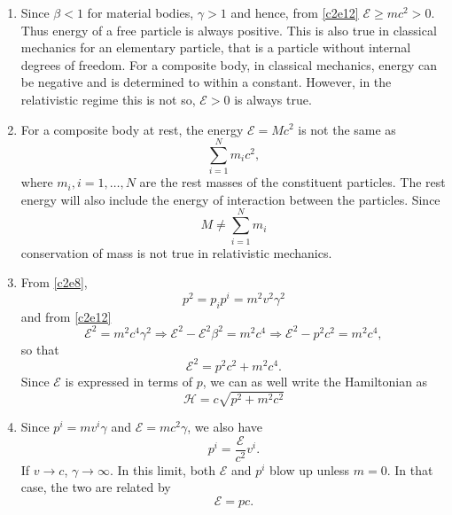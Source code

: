 \begin{enumerate}
\item Since $\beta < 1$ for material bodies, $\gamma > 1$ and hence, from 
\eqref{c2e12} $\mathcal{E} \ge mc^2 > 0$. Thus energy of a free particle is always positive.
This is also true in classical mechanics for an elementary particle, that is a
particle without internal degrees of freedom. For a composite body, in classical
mechanics, energy can be negative and is determined to within a constant. However,
in the relativistic regime this is not so, $\mathcal{E} > 0$ is always true.

\item For a composite body at rest, the energy $\mathcal{E} = Mc^2$ is not the same as 
\[
\sum_{i=1}^N m_ic^2,
\]
where $m_i, i = 1, \ldots, N$ are the rest masses of the constituent particles.
The rest energy will also include the energy of interaction between the particles.
Since 
\[
M \ne \sum_{i=1}^N m_i
\]
conservation of mass is not true in relativistic mechanics.

\item From \eqref{c2e8},
\[
p^2 = p_ip^i = m^2v^2\gamma^2
\]
and from \eqref{c2e12}
\[
\mathcal{E}^2 = m^2c^4\gamma^2 \Rightarrow \mathcal{E}^2 - \mathcal{E}^2\beta^2 
= m^2c^4 \Rightarrow \mathcal{E}^2 - p^2c^2  = m^2c^4,
\]
so that
\begin{equation}\label{c2e15}
\mathcal{E}^2 = p^2c^2 + m^2c^4.
\end{equation}
Since $\mathcal{E}$ is expressed in terms of $p$, we can as well write the Hamiltonian as
\begin{equation}\label{c2e16}
\mathcal{H} = c\sqrt{p^2 + m^2c^2}
\end{equation}

\item Since $p^i = mv^i\gamma$ and $\mathcal{E} = mc^2\gamma$, we also have
\begin{equation}\label{c2e17}
p^i = \frac{\mathcal{E}}{c^2}v^i.
\end{equation}
If $v \rightarrow c$, $\gamma \rightarrow \infty$. In this limit, both $\mathcal{E}$ and
$p^i$ blow up unless $m = 0$. In that case, the two are related by
\begin{equation}\label{c2e18}
\mathcal{E} = pc.
\end{equation}


\end{enumerate}
